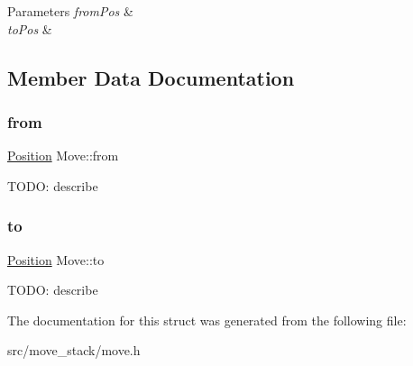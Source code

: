 \begin{DoxyParams}{Parameters}
{\em from\+Pos} & \\
\hline
{\em to\+Pos} & \\
\hline
\end{DoxyParams}


\subsection{Member Data Documentation}
\mbox{\label{struct_move_add76f7fa185380a7a02b6904bf48dc87}} 
\subsubsection{\texorpdfstring{from}{from}}
{\footnotesize\ttfamily \mbox{\hyperlink{struct_position}{Position}} Move\+::from}

T\+O\+DO\+: describe \mbox{\label{struct_move_a6b0d3fd05bd190244015848d4a1b0aae}} 
\subsubsection{\texorpdfstring{to}{to}}
{\footnotesize\ttfamily \mbox{\hyperlink{struct_position}{Position}} Move\+::to}

T\+O\+DO\+: describe 

The documentation for this struct was generated from the following file\+:\begin{DoxyCompactItemize}
\item 
src/move\+\_\+stack/move.\+h\end{DoxyCompactItemize}
